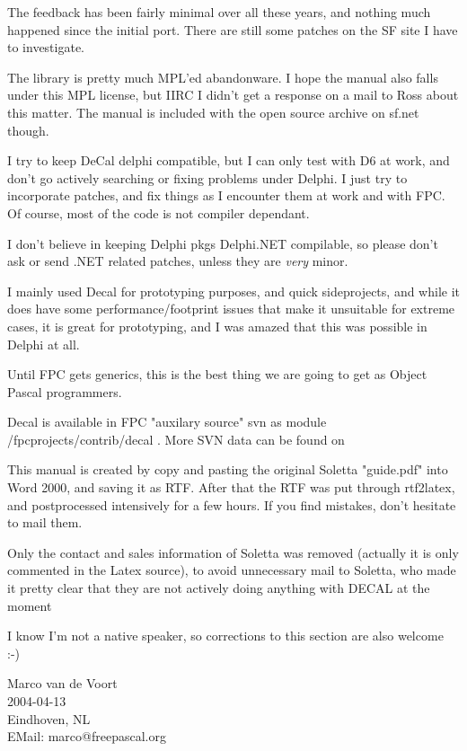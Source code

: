 \documentclass{report}
\begin{document}
The feedback has been fairly minimal over all these years, and nothing much
happened since the initial port. There are still some patches on the SF site
I have to investigate.

The library is pretty much MPL'ed abandonware. I hope the manual also falls
under this MPL license, but IIRC I didn't get a response on a mail to Ross
about this matter. The manual is included with the open source archive
on sf.net though.

I try to keep DeCal delphi compatible, but I can only test with D6 at work,
and don't go actively searching or fixing problems under Delphi. I just try
to incorporate patches, and fix things as I encounter them at work and with
FPC. Of course, most of the code is not compiler dependant.

I don't believe in keeping Delphi pkgs Delphi.NET compilable, so please
don't ask or send .NET related patches, unless they are \emph{very} minor.

I mainly used Decal for prototyping purposes, and quick sideprojects, and
while it does have some performance/footprint issues that make it unsuitable
for extreme cases, it is great for prototyping, and I was amazed that this
was possible in Delphi at all.

Until FPC gets generics, this is the best thing we are going to get as
Object Pascal programmers.

Decal is available in FPC "auxilary source" svn as module
/fpcprojects/contrib/decal . More SVN data can be found on 

This manual is created by copy and pasting the original Soletta "guide.pdf"
into Word 2000, and saving it as RTF. After that the RTF was put through
rtf2latex, and postprocessed intensively for a few hours. If you find
mistakes, don't hesitate to mail them.

Only the contact and sales information of Soletta was removed (actually it
is only commented in the Latex source), to avoid unnecessary mail to
Soletta, who made it pretty clear that they are not actively doing anything
with DECAL at the moment

I know I'm not a native speaker, so corrections to this section are also
welcome :-)

\begin{flushright}
Marco van de Voort \\
2004-04-13 \\
Eindhoven, NL  \\
EMail: marco@freepascal.org \\
\end{flushright}
\end{document}
